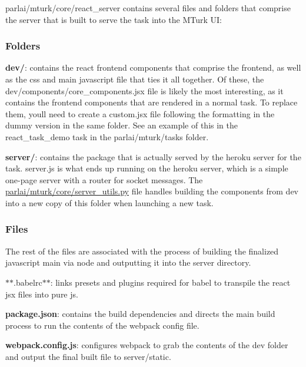 {\ttfamily parlai/mturk/core/react\+\_\+server} contains several files and folders that comprise the server that is built to serve the task into the M\+Turk UI\+:

\subsubsection*{Folders}


\begin{DoxyItemize}
\item {\bfseries dev/}\+: contains the react frontend components that comprise the frontend, as well as the css and main javascript file that ties it all together. Of these, the {\ttfamily dev/components/core\+\_\+components.\+jsx} file is likely the most interesting, as it contains the frontend components that are rendered in a normal task. To replace them, you\textquotesingle{}ll need to create a {\ttfamily custom.\+jsx} file following the formatting in the dummy version in the same folder. See an example of this in the {\ttfamily react\+\_\+task\+\_\+demo} task in the {\ttfamily parlai/mturk/tasks} folder.
\item {\bfseries server/}\+: contains the package that is actually served by the heroku server for the task. {\ttfamily server.\+js} is what ends up running on the heroku server, which is a simple one-\/page server with a router for socket messages. The {\ttfamily \hyperlink{mturk_2core_2server__utils_8py}{parlai/mturk/core/server\+\_\+utils.\+py}} file handles building the components from dev into a new copy of this folder when launching a new task.
\end{DoxyItemize}

\subsubsection*{Files}

The rest of the files are associated with the process of building the finalized javascript main via node and outputting it into the server directory.


\begin{DoxyItemize}
\item $\ast$$\ast$.babelrc$\ast$$\ast$\+: links presets and plugins required for babel to transpile the react jsx files into pure js.
\item {\bfseries package.\+json}\+: contains the build dependencies and directs the main build process to run the contents of the webpack config file.
\item {\bfseries webpack.\+config.\+js}\+: configures webpack to grab the contents of the {\ttfamily dev} folder and output the final built file to {\ttfamily server/static}. 
\end{DoxyItemize}
